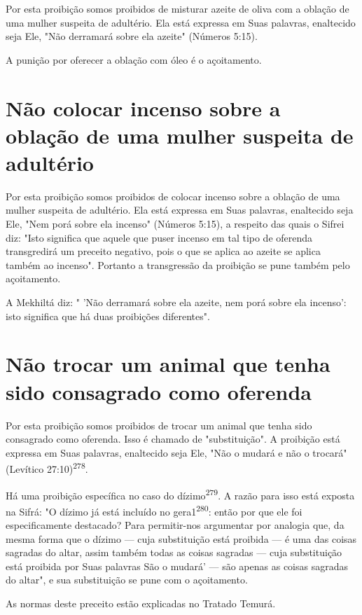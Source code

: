 \begin{itemize}
\begin{enumrate}
\begin{itemize}
\begin{itemize}
\begin{itemize}
Por esta proibição somos proibidos de misturar azeite de oliva com a
oblação de uma mulher suspeita de adultério. Ela está expressa em Suas
pala­vras, enaltecido seja Ele, "Não derramará sobre ela azeite"
(Números 5:15).

A punição por oferecer a oblação com óleo é o açoitamento.

\section{Não colocar incenso sobre a oblação de uma mulher suspeita de adultério}

Por esta proibição somos proibidos de colocar incenso sobre a obla­ção
de uma mulher suspeita de adultério. Ela está expressa em Suas palavras,
enaltecido seja Ele, "Nem porá sobre ela incenso" (Números 5:15), a
respeito das quais o Sifrei diz: "Isto significa que aquele que puser
incenso em tal tipo de oferenda transgredirá um preceito negativo, pois
o que se aplica ao azeite se aplica também ao incenso". Portanto a
transgressão da proibição se pune também pelo açoitamento.

A Mekhiltá diz: " 'Não derramará sobre ela azeite, nem porá sobre ela
incenso': isto significa que há duas proibições diferentes".

\section{Não trocar um animal que tenha sido consagrado como oferenda}

Por esta proibição somos proibidos de trocar um animal que tenha sido
consagrado como oferenda. Isso é chamado de "substituição". A proibi­ção
está expressa em Suas palavras, enaltecido seja Ele, "Não o mudará e não
o trocará" (Levítico 27:10)\textsuperscript{278}.

Há uma proibição específica no caso do dízimo\textsuperscript{279}. A
razão para is­so está exposta na Sifrá: "O dízimo já está incluído no
gera1\textsuperscript{280}: então por que ele foi especificamente
destacado? Para permitir-nos argumentar por analogia que, da mesma forma
que o dízimo --- cuja substituição está proibida --- é uma das coisas
sagradas do altar, assim também todas as coisas sagradas --- cuja
subs­tituição está proibida por Suas palavras São o mudará' --- são
apenas as coisas sagradas do altar", e sua substituição se pune com o
açoitamento.

As normas deste preceito estão explicadas no Tratado Temurá.



\end{itemize}
\end{itemize}
\end{itemize}
\end{enumrate}
\end{itemize}
